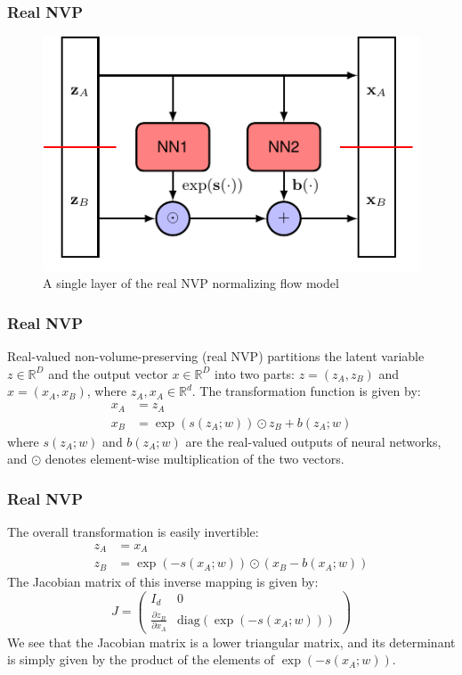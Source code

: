 \documentclass{beamer}
\begin{document}
\begin{frame}
    \frametitle{Real NVP}
    \begin{figure}
        \caption{A single layer of the real NVP normalizing flow model}
        \includegraphics{Figure_1.pdf}
    \end{figure}
\end{frame}

\begin{frame}
    \frametitle{Real NVP}
    Real-valued non-volume-preserving (real NVP) partitions the latent variable $z\in\mathbb{R}^{D}$ and the output vector $x\in\mathbb{R}^{D}$ into two parts: $z=(z_{A},z_{B})$ and $x=(x_{A},x_{B})$, where $z_{A},x_{A}\in\mathbb{R}^{d}$. The transformation function is given by:
    \begin{align*}
        x_{A}&=z_{A} \\
        x_{B}&=\exp(s(z_{A};w))\odot{}z_{B}+b(z_{A};w)
    \end{align*}
    where $s(z_{A};w)$ and $b(z_{A};w)$ are the real-valued outputs of neural networks, and $\odot$ denotes element-wise multiplication of the two vectors.
\end{frame}

\begin{frame}
    \frametitle{Real NVP}
    The overall transformation is easily invertible:
    \begin{align*}
        z_{A}&=x_{A} \\
        z_{B}&=\exp(-s(x_{A};w))\odot(x_{B}-b(x_{A};w))
    \end{align*}
    The Jacobian matrix of this inverse mapping is given by:
    \begin{equation*}
        J=\begin{pmatrix}
            I_{d}&0 \\
            \frac{\partial{}z_{B}}{\partial{}x_{A}}&\mathrm{diag}(\exp(-s(x_{A};w)))
        \end{pmatrix}
    \end{equation*}
    We see that the Jacobian matrix is a lower triangular matrix, and its determinant is simply given by the product of the elements of $\exp(-s(x_{A};w))$.
\end{frame}
\end{document}
